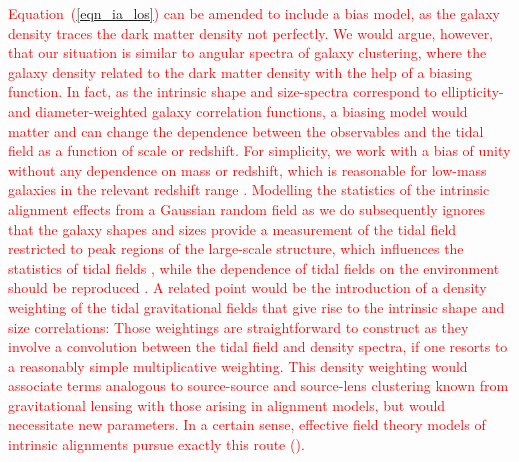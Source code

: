 \documentclass[a4paper,fleqn,usenatbib]{mnras}
\newcommand\foca[1]{\textcolor{red}{#1}}
\begin{document}
\foca{Equation~(\ref{eqn_ia_los}) can be amended to include a bias model, as the galaxy density traces the dark matter density not perfectly. We would argue, however, that our situation is similar to angular spectra of galaxy clustering, where the galaxy density related to the dark matter density with the help of a biasing function. In fact, as the intrinsic shape and size-spectra correspond to ellipticity- and diameter-weighted galaxy correlation functions, a biasing model would matter and can change the dependence between the observables and the tidal field as a function of scale or redshift. For simplicity, we work with a bias of unity without any dependence on mass or redshift, which is reasonable for low-mass galaxies in the relevant redshift range \citep{sheth_large-scale_1999}.} \foca{Modelling the statistics of the intrinsic alignment effects from a Gaussian random field as we do subsequently ignores that the galaxy shapes and sizes provide a measurement of the tidal field restricted to peak regions of the large-scale structure, which influences the statistics of tidal fields \citep{peacock_statistics_1985, schafer_galactic_2012}, while the dependence of tidal fields on the environment should be reproduced \citep{forero-romero_cosmic_2014, reischke_environmental_2018}.} \foca{A related point would be the introduction of a density weighting of the tidal gravitational fields that give rise to the intrinsic shape and size correlations: Those weightings are straightforward to construct as they involve a convolution between the tidal field and density spectra, if one resorts to a reasonably simple multiplicative weighting. This density weighting would associate terms analogous to source-source and source-lens clustering known from gravitational lensing with those arising in alignment models, but would necessitate new parameters. In a certain sense, effective field theory models of intrinsic alignments pursue exactly this route (\cite{PhysRevD.100.103506}).}
\end{document}
